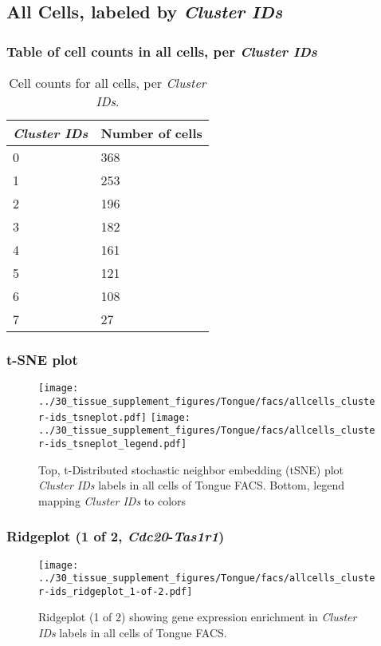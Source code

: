\clearpage

\subsection{All Cells, labeled by \emph{Cluster IDs}}
\subsubsection{Table of cell counts in all cells, per \emph{Cluster IDs}}\begin{table}[h]
\centering
\label{my-label}
\begin{tabular}{@{}ll@{}}
\toprule

\emph{Cluster IDs}& Number of cells \\ \midrule
0 & 368 \\

1 & 253 \\

2 & 196 \\

3 & 182 \\

4 & 161 \\

5 & 121 \\

6 & 108 \\

7 & 27 \\
\bottomrule
\end{tabular}
\caption{Cell counts for all cells, per \emph{Cluster IDs}.}
\end{table}

\clearpage
\subsubsection{t-SNE plot}
\begin{figure}[h]
\centering
\texttt{[image: ../30\_tissue\_supplement\_figures/Tongue/facs/allcells\_cluster-ids\_tsneplot.pdf]}
\texttt{[image: ../30\_tissue\_supplement\_figures/Tongue/facs/allcells\_cluster-ids\_tsneplot\_legend.pdf]}
\caption{Top, t-Distributed stochastic neighbor embedding (tSNE) plot  \emph{Cluster IDs} labels in all cells of Tongue FACS. Bottom, legend mapping \emph{Cluster IDs} to colors}
\end{figure}


\clearpage

\subsubsection{Ridgeplot (1 of 2, \emph{Cdc20}-\emph{Tas1r1})}
\begin{figure}[h]
\centering
\texttt{[image: ../30\_tissue\_supplement\_figures/Tongue/facs/allcells\_cluster-ids\_ridgeplot\_1-of-2.pdf]}

\caption{ Ridgeplot (1 of 2)  showing gene expression enrichment in \emph{Cluster IDs} labels in all cells of Tongue FACS. }
\end{figure}


